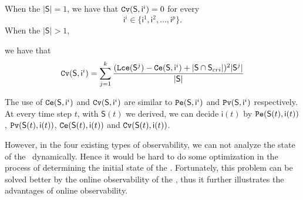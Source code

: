 \begin{definition} 
When the $|\mathsf{S}|=1$, we have that
${\tt Cv}(\mathsf{S}, \mathsf{ i}^{i})=0$ for every  \[\mathsf{ i}^{i} \in \{\mathsf{ i}^{1},\mathsf{ i}^{2},\ldots, \mathsf{ i}^{p}\}.\]   When the $|\mathsf{S}|>1$, 

we have that  \\
\begin{equation}
\begin{split}
{\tt Cv}(\mathsf{S}, \mathsf{ i}^{i})=\sum_{j=1}^k\frac{ ({\tt Lce}(\mathsf{S}^{j})-{\tt Ce}(\mathsf{S}, \mathsf{ i}^{i})+|\mathsf{S} \cap \mathsf{S}_{cri}|)^2 |\mathsf{S}^{j}|}{ |\mathsf{S}|}
\end{split}
\end{equation}
\end{definition}

The use of ${\tt Ce}(\mathsf{S}, \mathsf{ i}^{i})$ and ${\tt Cv}(\mathsf{S}, \mathsf{ i}^{i})$ are similar to ${\tt Pe}(\mathsf{S}, \mathsf{ i}^{i})$ and ${\tt Pv}(\mathsf{S}, \mathsf{ i}^{i})$ respectively. At every time step $t$, with $\mathsf{S}(t)$ we derived, we can decide $\mathsf{i}(t)$ by $ {\tt Pe}(\mathsf{S}(t), \mathsf{ i}(t))$, ${\tt Pv}(\mathsf{S}(t), \mathsf{ i}(t))$, ${\tt Ce}(\mathsf{S}(t), \mathsf{ i}(t))$ and ${\tt Cv}(\mathsf{S}(t), \mathsf{ i}(t))$.

However, in the four existing types of observability, we can not analyze the state of the \BCNs\ dynamically. Hence it would be hard to do some optimization in the process of determining the initial state of the \BCNs. Fortunately, this problem can be solved better by the online observability of the \BCNs, thus it further illustrates the advantages of online observability.